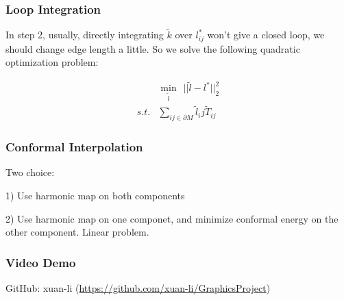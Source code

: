 \documentclass{beamer}
\begin{document}
\begin{frame}
\frametitle{Loop Integration}
In step 2, usually, directly integrating $\tilde{k}$ over $l_{ij}^*$ won't give a closed loop, we should change edge length a little. So we solve the following quadratic optimization problem:

\begin{equation}
\begin{split}
&\min_{\tilde{l}}\ \  ||\tilde{l} - l^*||^2_2\\
s.t. & \sum_{ij\in \partial M} \tilde{l}_ij \tilde{T}_{ij}
\end{split}
\end{equation}
\end{frame}



\begin{frame}
\frametitle{Conformal Interpolation}
Two choice:

1) Use harmonic map on both components

2) Use harmonic map on one componet, and minimize conformal energy on the other component. Linear problem.
\end{frame}

\begin{frame}
\frametitle{Video Demo}
GitHub: xuan-li (\url{https://github.com/xuan-li/GraphicsProject})

\end{frame}

\end{document}
